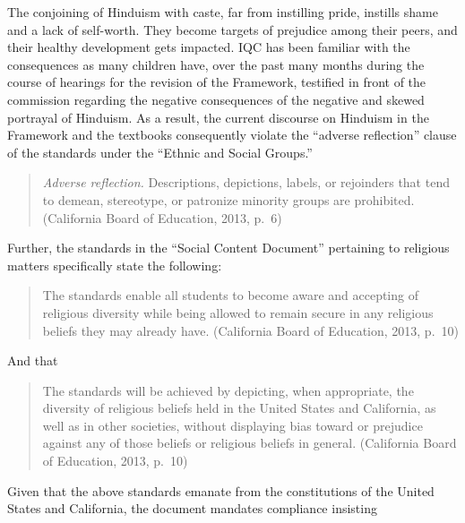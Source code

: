 The conjoining of Hinduism with caste, far from instilling pride, instills shame and a lack of self-worth. They become targets of prejudice among their peers, and their healthy development gets impacted. IQC has been familiar with the consequences as many children have, over the past many months during the course of hearings for the revision of the Framework, testified in front of the commission regarding the negative consequences of the negative and skewed portrayal of Hinduism. As a result, the current discourse on Hinduism in the Framework and the textbooks consequently violate the “adverse reflection” clause of the standards under the “Ethnic and Social Groups.” 
\begin{quote}
\textit{Adverse reflection.} Descriptions, depictions, labels, or rejoinders that tend to demean, stereotype, or patronize minority groups are prohibited. (California Board of Education, 2013, p.\ 6)
\end{quote}
Further, the standards in the “Social Content Document” pertaining to religious matters specifically state the following:
\begin{quote}
The standards enable all students to become aware and accepting of religious diversity while being allowed to remain secure in any religious beliefs they may already have. (California Board of Education, 2013, p.\ 10)
\end{quote}
And that
\begin{quote}
The standards will be achieved by depicting, when appropriate, the diversity of religious beliefs held in the United States and California, as well as in other societies, without displaying bias toward or prejudice against any of those beliefs or religious beliefs in general. (California Board of Education, 2013, p.~10)
\end{quote}
Given that the above standards emanate from the constitutions of the United States and California, the document mandates compliance insisting

